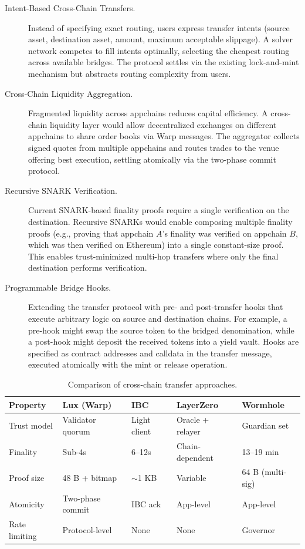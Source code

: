 \begin{description}
    \item[Intent-Based Cross-Chain Transfers.] Instead of specifying exact routing, users express transfer intents (source asset, destination asset, amount, maximum acceptable slippage). A solver network competes to fill intents optimally, selecting the cheapest routing across available bridges. The protocol settles via the existing lock-and-mint mechanism but abstracts routing complexity from users.

    \item[Cross-Chain Liquidity Aggregation.] Fragmented liquidity across appchains reduces capital efficiency. A cross-chain liquidity layer would allow decentralized exchanges on different appchains to share order books via Warp messages. The aggregator collects signed quotes from multiple appchains and routes trades to the venue offering best execution, settling atomically via the two-phase commit protocol.

    \item[Recursive SNARK Verification.] Current SNARK-based finality proofs require a single verification on the destination. Recursive SNARKs would enable composing multiple finality proofs (e.g., proving that appchain $A$'s finality was verified on appchain $B$, which was then verified on Ethereum) into a single constant-size proof. This enables trust-minimized multi-hop transfers where only the final destination performs verification.

    \item[Programmable Bridge Hooks.] Extending the transfer protocol with pre- and post-transfer hooks that execute arbitrary logic on source and destination chains. For example, a pre-hook might swap the source token to the bridged denomination, while a post-hook might deposit the received tokens into a yield vault. Hooks are specified as contract addresses and calldata in the transfer message, executed atomically with the mint or release operation.
\end{description}

\begin{table}[H]
\centering
\caption{Comparison of cross-chain transfer approaches.}
\label{tab:bridgecompare}
\begin{tabular}{p{2.8cm}p{2cm}p{2cm}p{2cm}p{2.5cm}}
\toprule
\textbf{Property} & \textbf{Lux (Warp)} & \textbf{IBC} & \textbf{LayerZero} & \textbf{Wormhole} \\
\midrule
Trust model & Validator quorum & Light client & Oracle + relayer & Guardian set \\
Finality & Sub-4s & 6--12s & Chain-dependent & 13--19 min \\
Proof size & 48 B + bitmap & $\sim$1 KB & Variable & 64 B (multi-sig) \\
Atomicity & Two-phase commit & IBC ack & App-level & App-level \\
Rate limiting & Protocol-level & None & None & Governor \\
\bottomrule
\end{tabular}
\end{table}


